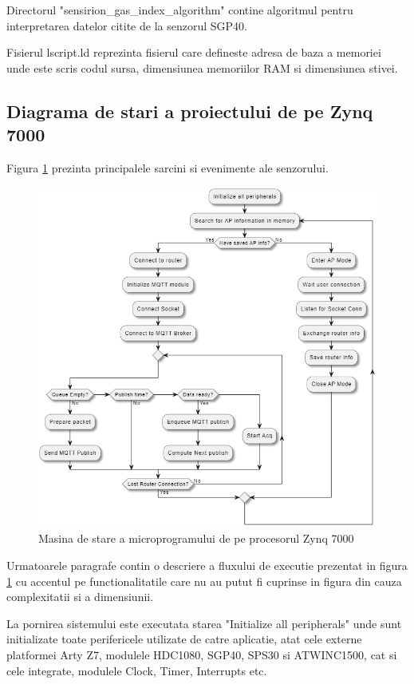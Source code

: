Directorul "sensirion\_gas\_index\_algorithm" contine algoritmul pentru interpretarea datelor citite de la senzorul SGP40.

Fisierul lscript.ld reprezinta fisierul care defineste adresa de baza a memoriei unde este scris codul sursa, dimensiunea memoriilor RAM si dimensiunea stivei.

\subsection{Diagrama de stari a proiectului de pe Zynq 7000}\label{subsec:pi_senzor_statediagram}
Figura \ref{fig:PI_MainStateMachine} prezinta principalele sarcini si evenimente ale senzorului.
\begin{figure}[H]
    \centering
    \includegraphics[scale=0.66]{figs/PI_MainStateMachine.png}
    \caption{Masina de stare a microprogramului de pe procesorul Zynq 7000}
    \label{fig:PI_MainStateMachine}
\end{figure}

Urmatoarele paragrafe contin o descriere a fluxului de executie prezentat in figura \ref{fig:PI_MainStateMachine} cu accentul pe functionalitatile care nu au putut 
fi cuprinse in figura din cauza complexitatii si a dimensiunii. 

La pornirea sistemului este executata starea "Initialize all peripherals" unde sunt initializate toate perifericele utilizate de catre aplicatie, atat cele externe 
platformei Arty Z7, modulele HDC1080, SGP40, SPS30 si ATWINC1500, cat si cele integrate, modulele Clock, Timer, Interrupts etc.

